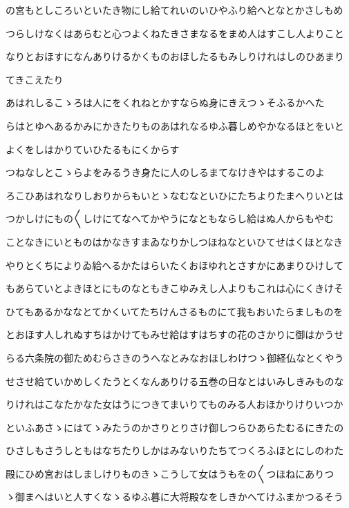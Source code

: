 \documentclass[a4paper,11pt,landscape]{ltjtarticle}
\begin{document}
の宮もとしころいといたき物にし給てれいのいひやふり給へとなとかさしもめ
\par\medskip
つらしけなくはあらむと心つよくねたきさまなるをまめ人はすこし人よりこと
\par\medskip
なりとおほすになんありけるかくものおほしたるもみしりけれはしのひあまり
\par\medskip
てきこえたり
\par\medskip
あはれしるこゝろは人にをくれねとかすならぬ身にきえつゝそふるかへた
\par\medskip
らはとゆへあるかみにかきたりものあはれなるゆふ暮しめやかなるほとをいと
\par\medskip
よくをしはかりていひたるもにくからす
\par\medskip
つねなしとこゝらよをみるうき身たに人のしるまてなけきやはするこのよ
\par\medskip
ろこひあはれなりしおりからもいとゝなむなといひにたちよりたまへりいとは
\par\medskip
つかしけにもの〱しけにてなへてかやうになともならし給はぬ人からもやむ
\par\medskip
ことなきにいとものはかなきすまゐなりかしつほねなといひてせはくほとなき
\par\medskip
やりとくちによりゐ給へるかたはらいたくおほゆれとさすかにあまりひけして
\par\medskip
もあらていとよきほとにものなともきこゆみえし人よりもこれは心にくきけそ
\par\medskip
ひてもあるかななとてかくいてたちけんさるものにて我もおいたらましものを
\par\medskip
とおほす人しれぬすちはかけてもみせ給はすはちすの花のさかりに御はかうせ
\par\medskip
らる六条院の御ためむらさきのうへなとみなおほしわけつゝ御経仏なとくやう
\par\medskip
せさせ給ていかめしくたうとくなんありける五巻の日なとはいみしきみものな
\par\medskip
りけれはこなたかなた女はうにつきてまいりてものみる人おほかりけりいつか
\par\medskip
といふあさゝにはてゝみたうのかさりとりさけ御しつらひあらたむるにきたの
\par\medskip
ひさしもさうしともはなちたりしかはみないりたちてつくろふほとにしのわた
\par\medskip
殿にひめ宮おはしましけりものきゝこうして女はうもをの〱つほねにありつ
\par\medskip
ゝ御まへはいと人すくなゝるゆふ暮に大将殿なをしきかへてけふまかつるそう
\par\medskip
\end{document}
